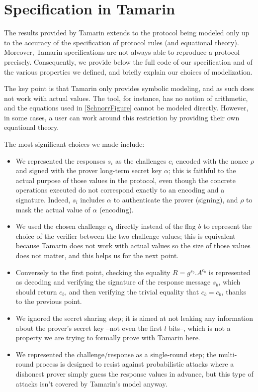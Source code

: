 \section{Specification in Tamarin}%
\label{apdx:tamarin-spec}

The results provided by Tamarin extends to the protocol being modeled 
only up to the accuracy of the specification of protocol rules (and equational theory).
Moreover, Tamarin specifications are not always able to reproduce a protocol precisely.
Consequently, we provide below the full code of our specification and of the various properties we defined, and briefly explain our choices of modelization.

The key point is that Tamarin only provides symbolic modeling, and as such does not work with actual values. The tool, for instance, has no notion of arithmetic, and the equations used in \cref{SchnorrFigure} cannot be modeled directly. However, in some cases, a user can work around this restriction by providing their own equational theory.

The most significant choices we made include:
\begin{itemize}
	\item We represented the responses $s_i$ as the challenges $c_i$ encoded with the nonce $\rho$ and signed with the prover long-term secret key $\alpha$; this is faithful to the actual purpose of those values in the protocol, even though the concrete operations executed do not correspond exactly to an encoding and a signature. Indeed, $s_i$ includes $\alpha$ to authenticate the prover (signing), and $\rho$ to mask the actual value of $\alpha$ (encoding).
	\item We used the chosen challenge $c_b$ directly instead of the flag $b$ to represent the choice of the verifier between the two challenge values; this is equivalent because Tamarin does not work with actual values so the size of those values does not matter, and this helps us for the next point.
	\item Conversely to the first point, checking the equality $R = g^{s_b}.A^{c_b}$ is represented as decoding and verifying the signature of the response message $s_b$, which should return $c_b$, and then verifying the trivial equality that $c_b = c_b$, thanks to the previous point.
	\item We ignored the secret sharing step; it is aimed at not leaking any information about the prover's secret key --not even the first $l$ bits--, which is not a property we are trying to formally prove with Tamarin here.
	\item We represented the challenge/response as a single-round step; the multi-round process is designed to resist against probabilistic attacks where a dishonest prover simply guess the response values in advance, but this type of attacks isn't covered by Tamarin's model anyway.
\end{itemize}

